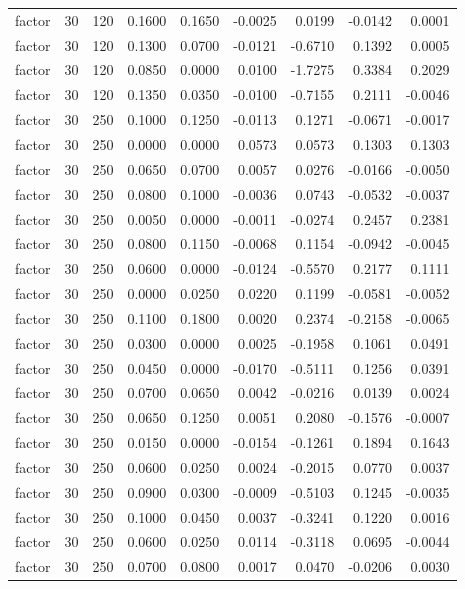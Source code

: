 \begin{tabular}{lrrrrrrrr}
factor & 30 & 120 & 0.1600 & 0.1650 & -0.0025 & 0.0199 & -0.0142 & 0.0001 \\
factor & 30 & 120 & 0.1300 & 0.0700 & -0.0121 & -0.6710 & 0.1392 & 0.0005 \\
factor & 30 & 120 & 0.0850 & 0.0000 & 0.0100 & -1.7275 & 0.3384 & 0.2029 \\
factor & 30 & 120 & 0.1350 & 0.0350 & -0.0100 & -0.7155 & 0.2111 & -0.0046 \\
factor & 30 & 250 & 0.1000 & 0.1250 & -0.0113 & 0.1271 & -0.0671 & -0.0017 \\
factor & 30 & 250 & 0.0000 & 0.0000 & 0.0573 & 0.0573 & 0.1303 & 0.1303 \\
factor & 30 & 250 & 0.0650 & 0.0700 & 0.0057 & 0.0276 & -0.0166 & -0.0050 \\
factor & 30 & 250 & 0.0800 & 0.1000 & -0.0036 & 0.0743 & -0.0532 & -0.0037 \\
factor & 30 & 250 & 0.0050 & 0.0000 & -0.0011 & -0.0274 & 0.2457 & 0.2381 \\
factor & 30 & 250 & 0.0800 & 0.1150 & -0.0068 & 0.1154 & -0.0942 & -0.0045 \\
factor & 30 & 250 & 0.0600 & 0.0000 & -0.0124 & -0.5570 & 0.2177 & 0.1111 \\
factor & 30 & 250 & 0.0000 & 0.0250 & 0.0220 & 0.1199 & -0.0581 & -0.0052 \\
factor & 30 & 250 & 0.1100 & 0.1800 & 0.0020 & 0.2374 & -0.2158 & -0.0065 \\
factor & 30 & 250 & 0.0300 & 0.0000 & 0.0025 & -0.1958 & 0.1061 & 0.0491 \\
factor & 30 & 250 & 0.0450 & 0.0000 & -0.0170 & -0.5111 & 0.1256 & 0.0391 \\
factor & 30 & 250 & 0.0700 & 0.0650 & 0.0042 & -0.0216 & 0.0139 & 0.0024 \\
factor & 30 & 250 & 0.0650 & 0.1250 & 0.0051 & 0.2080 & -0.1576 & -0.0007 \\
factor & 30 & 250 & 0.0150 & 0.0000 & -0.0154 & -0.1261 & 0.1894 & 0.1643 \\
factor & 30 & 250 & 0.0600 & 0.0250 & 0.0024 & -0.2015 & 0.0770 & 0.0037 \\
factor & 30 & 250 & 0.0900 & 0.0300 & -0.0009 & -0.5103 & 0.1245 & -0.0035 \\
factor & 30 & 250 & 0.1000 & 0.0450 & 0.0037 & -0.3241 & 0.1220 & 0.0016 \\
factor & 30 & 250 & 0.0600 & 0.0250 & 0.0114 & -0.3118 & 0.0695 & -0.0044 \\
factor & 30 & 250 & 0.0700 & 0.0800 & 0.0017 & 0.0470 & -0.0206 & 0.0030 \\

\end{tabular}

